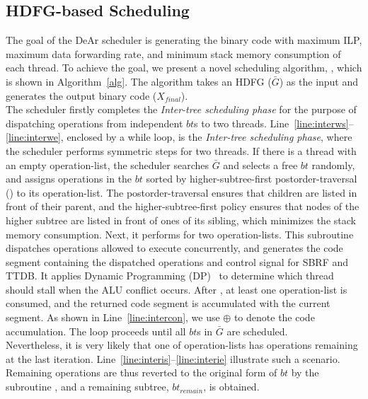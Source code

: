 \subsection{HDFG-based Scheduling}
\label{sec:scheduling}
The goal of the DeAr scheduler is generating the binary code with maximum ILP, maximum data forwarding rate, 
and minimum stack memory consumption of each thread.
To achieve the goal, we present a novel scheduling algorithm, 
, which is shown in Algorithm~\ref{alg}.
The algorithm takes an HDFG ($\bar{G}$) as the input and generates the output binary code ($X_{final}$).
\\\indent
The scheduler firstly completes the \textit{Inter-tree scheduling phase}
for the purpose of dispatching operations from independent $bt$s to two threads.
Line~\ref{line:interws}--\ref{line:interwe}, enclosed by a while loop, is the \textit{Inter-tree scheduling phase}, 
where the scheduler performs symmetric steps for two threads.
If there is a thread with an empty operation-list, 
the scheduler searches $\bar{G}$ and selects a free $bt$ randomly, 
and assigns operations in the $bt$ sorted by higher-subtree-first postorder-traversal () to its operation-list.
The postorder-traversal ensures that children are listed in front of their parent, 
and the higher-subtree-first policy ensures that nodes of the higher subtree are listed in front of ones of its sibling, 
which minimizes the stack memory consumption.
Next, it performs  for two operation-lists.
This subroutine dispatches operations allowed to execute concurrently, 
and generates the code segment containing the dispatched operations and control signal for SBRF and TTDB.
It applies Dynamic Programming (DP)~\cite{dp} to determine which thread should stall when the ALU conflict occurs.
After , at least one operation-list is consumed, 
and the returned code segment is accumulated with the current segment.
As shown in Line~\ref{line:intercon}, we use $\oplus$ to denote the code accumulation.
The loop proceeds until all $bt$s in $\bar{G}$ are scheduled.
\\\indent
Nevertheless, it is very likely that one of operation-lists has operations remaining at the last iteration.
Line~\ref{line:interis}--\ref{line:interie} illustrate such a scenario.
Remaining operations are thus reverted to the original form of $bt$ by the subroutine ,
and a remaining subtree, $bt_{remain}$, is obtained.%
\\\indent

